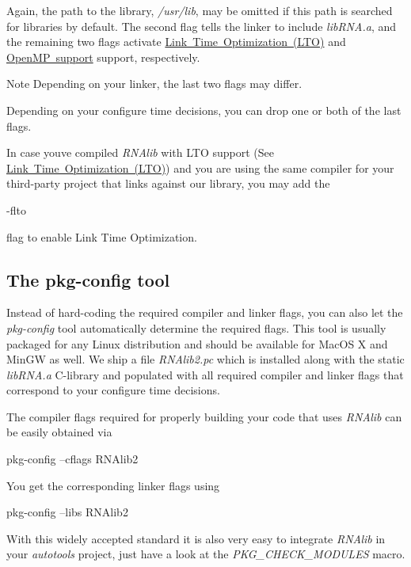 Again, the path to the library, {\itshape /usr/lib}, may be omitted if this path is searched for libraries by default. The second flag tells the linker to include {\itshape lib\+R\+N\+A.\+a}, and the remaining two flags activate \mbox{\hyperlink{install_config_lto}{Link Time Optimization (L\+TO)}} and \mbox{\hyperlink{install_config_openmp}{Open\+MP support}} support, respectively. \begin{DoxyNote}{Note}
Depending on your linker, the last two flags may differ. 

Depending on your configure time decisions, you can drop one or both of the last flags. 

In case you\textquotesingle{}ve compiled {\itshape R\+N\+Alib} with L\+TO support (See \mbox{\hyperlink{install_config_lto}{Link Time Optimization (L\+TO)}}) and you are using the same compiler for your third-\/party project that links against our library, you may add the
\begin{DoxyCode}
-flto 
\end{DoxyCode}
 flag to enable Link Time Optimization.
\end{DoxyNote}
\hypertarget{install_linking_pkgconfig}{}\subsection{The pkg-\/config tool}\label{install_linking_pkgconfig}
Instead of hard-\/coding the required compiler and linker flags, you can also let the {\itshape pkg-\/config} tool automatically determine the required flags. This tool is usually packaged for any Linux distribution and should be available for Mac\+OS X and Min\+GW as well. We ship a file {\itshape R\+N\+Alib2.\+pc} which is installed along with the static {\itshape lib\+R\+N\+A.\+a} C-\/library and populated with all required compiler and linker flags that correspond to your configure time decisions.

The compiler flags required for properly building your code that uses {\itshape R\+N\+Alib} can be easily obtained via

\begin{DoxyVerb}pkg-config --cflags RNAlib2
\end{DoxyVerb}


You get the corresponding linker flags using

\begin{DoxyVerb}pkg-config --libs RNAlib2
\end{DoxyVerb}


With this widely accepted standard it is also very easy to integrate {\itshape R\+N\+Alib} in your {\itshape autotools} project, just have a look at the {\itshape P\+K\+G\+\_\+\+C\+H\+E\+C\+K\+\_\+\+M\+O\+D\+U\+L\+ES} macro. 
